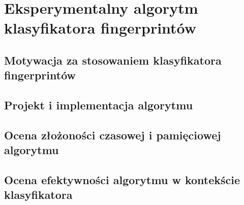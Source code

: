 \chapter{Eksperymentalny algorytm klasyfikatora fingerprintów}

\section{Motywacja za stosowaniem klasyfikatora fingerprintów}

\section{Projekt i implementacja algorytmu}

\section{Ocena złożoności czasowej i pamięciowej algorytmu}

\section{Ocena efektywności algorytmu w kontekście klasyfikatora}
